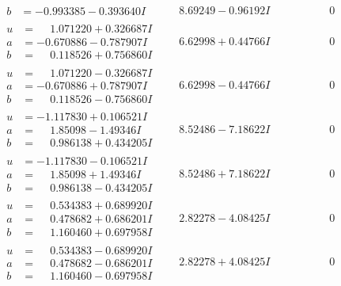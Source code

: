 \documentclass[1p]{elsarticle_modified}
\theoremstyle{definition}
\begin{document}
$$\begin{array}{c|c|c}
\begin{aligned}
b &= -0.993385 - 0.393640 I\end{aligned}
 & \phantom{-}8.69249 - 0.96192 I & \phantom{-0.000000 } 0 \\ \hline\begin{aligned}
u &= \phantom{-}1.071220 + 0.326687 I \\
a &= -0.670886 - 0.787907 I \\
b &= \phantom{-}0.118526 + 0.756860 I\end{aligned}
 & \phantom{-}6.62998 + 0.44766 I & \phantom{-0.000000 } 0 \\ \hline\begin{aligned}
u &= \phantom{-}1.071220 - 0.326687 I \\
a &= -0.670886 + 0.787907 I \\
b &= \phantom{-}0.118526 - 0.756860 I\end{aligned}
 & \phantom{-}6.62998 - 0.44766 I & \phantom{-0.000000 } 0 \\ \hline\begin{aligned}
u &= -1.117830 + 0.106521 I \\
a &= \phantom{-}1.85098 - 1.49346 I \\
b &= \phantom{-}0.986138 + 0.434205 I\end{aligned}
 & \phantom{-}8.52486 - 7.18622 I & \phantom{-0.000000 } 0 \\ \hline\begin{aligned}
u &= -1.117830 - 0.106521 I \\
a &= \phantom{-}1.85098 + 1.49346 I \\
b &= \phantom{-}0.986138 - 0.434205 I\end{aligned}
 & \phantom{-}8.52486 + 7.18622 I & \phantom{-0.000000 } 0 \\ \hline\begin{aligned}
u &= \phantom{-}0.534383 + 0.689920 I \\
a &= \phantom{-}0.478682 + 0.686201 I \\
b &= \phantom{-}1.160460 + 0.697958 I\end{aligned}
 & \phantom{-}2.82278 - 4.08425 I & \phantom{-0.000000 } 0 \\ \hline\begin{aligned}
u &= \phantom{-}0.534383 - 0.689920 I \\
a &= \phantom{-}0.478682 - 0.686201 I \\
b &= \phantom{-}1.160460 - 0.697958 I\end{aligned}
 & \phantom{-}2.82278 + 4.08425 I & \phantom{-0.000000 } 0 \\ \hline\begin{aligned}

\end{aligned}
\end{array}$$
\end{document}

